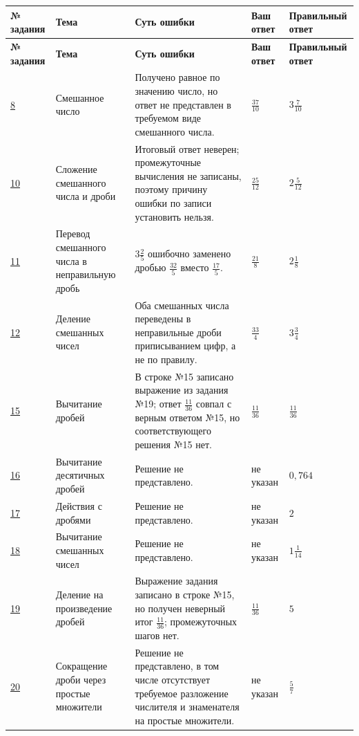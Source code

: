 \documentclass[12pt,a4paper]{article}
\begin{document}
{\small
\setlength{\tabcolsep}{3pt}
\begin{longtable}{@{}L{1.35cm}L{2.9cm}L{5.15cm}L{2.2cm}L{2.6cm}@{}}
\toprule
\textbf{№ задания} & \textbf{Тема} & \textbf{Суть ошибки} & \textbf{Ваш ответ} & \textbf{Правильный ответ} \\
\midrule
\endfirsthead
\toprule
\textbf{№ задания} & \textbf{Тема} & \textbf{Суть ошибки} & \textbf{Ваш ответ} & \textbf{Правильный ответ} \\
\midrule
\endhead

\hyperref[task:8]{8} &
Смешанное число &
Получено равное по значению число, но ответ не представлен в требуемом виде смешанного числа. &
$\frac{37}{10}$ &
$3\frac{7}{10}$ \\[0.35em]

\hyperref[task:10]{10} &
Сложение смешанного числа и дроби &
Итоговый ответ неверен; промежуточные вычисления не записаны, поэтому причину ошибки по записи установить нельзя. &
$\frac{25}{12}$ &
$2\frac{5}{12}$ \\[0.35em]

\hyperref[task:11]{11} &
Перевод смешанного числа в неправильную дробь &
$3\frac{2}{5}$ ошибочно заменено дробью $\frac{32}{5}$ вместо $\frac{17}{5}$. &
$\frac{21}{8}$ &
$2\frac{1}{8}$ \\[0.35em]

\hyperref[task:12]{12} &
Деление смешанных чисел &
Оба смешанных числа переведены в неправильные дроби приписыванием цифр, а не по правилу. &
$\frac{33}{4}$ &
$3\frac{3}{4}$ \\[0.35em]

\hyperref[task:15]{15} &
Вычитание дробей &
В строке №15 записано выражение из задания №19; ответ $\frac{11}{36}$ совпал с верным ответом №15, но соответствующего решения №15 нет. &
$\frac{11}{36}$ &
$\frac{11}{36}$ \\[0.35em]

\hyperref[task:16]{16} &
Вычитание десятичных дробей &
Решение не представлено. &
не указан &
$0{,}764$ \\[0.35em]

\hyperref[task:17]{17} &
Действия с дробями &
Решение не представлено. &
не указан &
$2$ \\[0.35em]

\hyperref[task:18]{18} &
Вычитание смешанных чисел &
Решение не представлено. &
не указан &
$1\frac{1}{14}$ \\[0.35em]

\hyperref[task:19]{19} &
Деление на произведение дробей &
Выражение задания записано в строке №15, но получен неверный итог $\frac{11}{36}$; промежуточных шагов нет. &
$\frac{11}{36}$ &
$5$ \\[0.35em]

\hyperref[task:20]{20} &
Сокращение дроби через простые множители &
Решение не представлено, в том числе отсутствует требуемое разложение числителя и знаменателя на простые множители. &
не указан &
$\frac{5}{7}$ \\
\bottomrule
\end{longtable}
}
\end{document}
